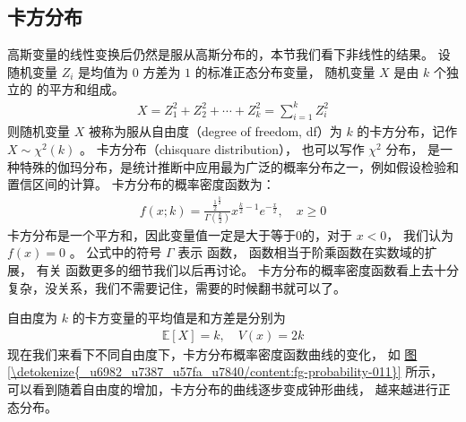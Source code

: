 \documentclass[letterpaper,10pt,english]{sphinxmanual}
\begin{document}
\subsection{卡方分布}
\label{\detokenize{_u6982_u7387_u57fa_u7840/content:id23}}
高斯变量的线性变换后仍然是服从高斯分布的，本节我们看下非线性的结果。
设随机变量 \(Z_i\) 是均值为 \(0\) 方差为 \(1\) 的标准正态分布变量，
随机变量 \(X\) 是由 \(k\) 个独立的  的平方和组成。
\begin{equation}\label{equation:概率基础/content:概率基础/content:74}
\begin{split}X = Z_1^2 + Z_2^2 + \cdots + Z_k^2 = \sum_{i=1}^k  Z_i^2\end{split}
\end{equation}
则随机变量 \(X\) 被称为服从自由度（degree of freedom, df）为 \(k\) 的卡方分布，记作 \(X \sim \chi^2(k)\) 。
卡方分布（chi\sphinxhyphen{}square distribution）， 也可以写作 \(\chi^2\) 分布，
是一种特殊的伽玛分布，是统计推断中应用最为广泛的概率分布之一，例如假设检验和置信区间的计算。
卡方分布的概率密度函数为：
\begin{equation}\label{equation:概率基础/content:概率基础/content:75}
\begin{split}f(x;k) = \frac{\frac{1}{2}^{\frac{k}{2}}}{\Gamma(\frac{k}{2})} x^{\frac{k}{2}-1} e^{-\frac{x}{2}}
, \quad x \ge 0\end{split}
\end{equation}
卡方分布是一个平方和，因此变量值一定是大于等于0的，对于 \(x <0\)，
我们认为 \(f(x)=0\) 。
公式中的符号 \(\Gamma\) 表示  函数，
 函数相当于阶乘函数在实数域的扩展，
有关  函数更多的细节我们以后再讨论。
卡方分布的概率密度函数看上去十分复杂，没关系，我们不需要记住，需要的时候翻书就可以了。

自由度为 \(k\) 的卡方变量的平均值是和方差是分别为
\begin{equation}\label{equation:概率基础/content:概率基础/content:76}
\begin{split}\mathbb{E}[X] = k, \quad V(x) = 2k\end{split}
\end{equation}
现在我们来看下不同自由度下，卡方分布概率密度函数曲线的变化，
如 \hyperref[\detokenize{_u6982_u7387_u57fa_u7840/content:fg-probability-011}]{图 \ref{\detokenize{_u6982_u7387_u57fa_u7840/content:fg-probability-011}}} 所示，
可以看到随着自由度的增加，卡方分布的曲线逐步变成钟形曲线，
越来越进行正态分布。
\end{document}
